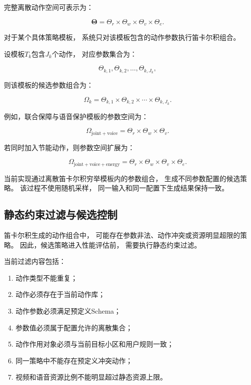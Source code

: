 \documentclass[lang=cn,12pt]{elegantbook}
\begin{document}
完整离散动作空间可表示为：

\begin{equation}
\boldsymbol{\Theta}
=
\Theta_r
\times
\Theta_w
\times
\Theta_v
\times
\Theta_e.
\label{eq:discrete_policy_parameter_space}
\end{equation}

对于某个具体策略模板，
系统只对该模板包含的动作参数执行笛卡尔积组合。

设模板$T_k$包含$J_k$个动作，
对应参数集合为：

\begin{equation}
\Theta_{k,1},
\Theta_{k,2},
\ldots,
\Theta_{k,J_k},
\end{equation}

则该模板的候选参数组合为：

\begin{equation}
\Omega_k
=
\Theta_{k,1}
\times
\Theta_{k,2}
\times
\cdots
\times
\Theta_{k,J_k}.
\label{eq:template_parameter_cartesian_product}
\end{equation}

例如，联合保障与语音保护模板的参数空间为：

\begin{equation}
\Omega_{\mathrm{joint+voice}}
=
\Theta_r
\times
\Theta_w
\times
\Theta_v.
\label{eq:joint_voice_parameter_space}
\end{equation}

若同时加入节能动作，则参数空间扩展为：

\begin{equation}
\Omega_{\mathrm{joint+voice+energy}}
=
\Theta_r
\times
\Theta_w
\times
\Theta_v
\times
\Theta_e.
\label{eq:joint_voice_energy_parameter_space}
\end{equation}

当前实现通过离散笛卡尔积穷举模板内的参数组合，
生成不同参数配置的候选策略。
该过程不使用随机采样，
同一输入和同一配置下生成结果保持一致。


\subsection*{静态约束过滤与候选控制}

笛卡尔积生成的动作组合中，
可能存在参数非法、动作冲突或资源明显超限的策略。
因此，候选策略进入性能评估前，
需要执行静态约束过滤。

当前过滤内容包括：

\begin{enumerate}[label=\arabic*)]
    \item 动作类型不能重复；
    \item 动作必须存在于当前动作库；
    \item 动作参数必须满足预定义Schema；
    \item 参数值必须属于配置允许的离散集合；
    \item 动作作用对象必须与当前目标小区和用户规则一致；
    \item 同一策略中不能存在预定义冲突动作；
    \item 视频和语音资源比例不能明显超过静态资源上限。
\end{enumerate}
\end{document}
